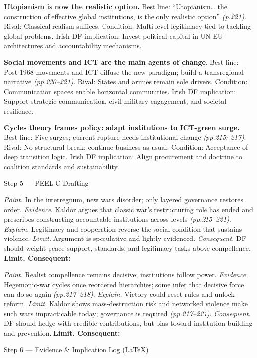 \textbf{Utopianism is now the realistic option.}
Best line: “Utopianism… the construction of effective global institutions, is the only realistic option” \emph{(p.221)}. Rival: Classical realism suffices. Condition: Multi-level legitimacy tied to tackling global problems. Irish DF implication: Invest political capital in UN-EU architectures and accountability mechanisms.

\textbf{Social movements and ICT are the main agents of change.}
Best line: Post-1968 movements and ICT diffuse the new paradigm; build a transregional narrative \emph{(pp.220–221)}. Rival: States and armies remain sole drivers. Condition: Communication spaces enable horizontal communities. Irish DF implication: Support strategic communication, civil-military engagement, and societal resilience.

\textbf{Cycles theory frames policy: adapt institutions to ICT-green surge.}
Best line: Five surges; current rupture needs institutional change \emph{(pp.215; 217)}. Rival: No structural break; continue business as usual. Condition: Acceptance of deep transition logic. Irish DF implication: Align procurement and doctrine to coalition standards and sustainability.

Step 5 — PEEL-C Drafting

\textit{Point.} In the interregnum, new wars disorder; only layered governance restores order.
\textit{Evidence.} Kaldor argues that classic war’s restructuring role has ended and prescribes constructing accountable institutions across levels \emph{(pp.215–221)}.
\textit{Explain.} Legitimacy and cooperation reverse the social condition that sustains violence.
\textit{Limit.} Argument is speculative and lightly evidenced.
\textit{Consequent.} DF should weight peace support, standards, and legitimacy tasks above compellence. \textbf{Limit. Consequent:}

\textit{Point.} Realist compellence remains decisive; institutions follow power.
\textit{Evidence.} Hegemonic-war cycles once reordered hierarchies; some infer that decisive force can do so again \emph{(pp.217–218)}.
\textit{Explain.} Victory could reset rules and unlock reform.
\textit{Limit.} Kaldor shows mass-destruction risk and networked violence make such wars impracticable today; governance is required \emph{(pp.217–221)}.
\textit{Consequent.} DF should hedge with credible contributions, but bias toward institution-building and prevention. \textbf{Limit. Consequent:}

Step 6 — Evidence \& Implication Log (LaTeX)

